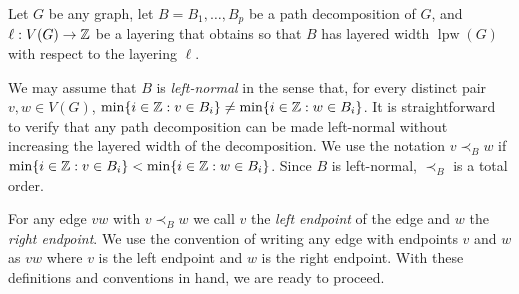 \documentclass{patmorin}
\DeclareMathOperator{\lpw}{lpw}
\begin{document}
Let $G$ be any graph, let $B=B_1,\ldots,B_p$ be a path decomposition of $G$, and $\ell:V(G)\to\mathbb{Z}$ be a layering that obtains so that $B$ has layered width $\lpw(G)$ with respect to the layering $\ell$.

We may assume that $B$ is \emph{left-normal} in the sense that, for every distinct pair $v,w\in V(G)$, $\min\{i\in\mathbb{Z} : v\in B_i\} \neq \min\{i\in\mathbb{Z}:w\in B_i\}$. It is straightforward to verify that any path decomposition can be made left-normal without increasing the layered width of the decomposition. 
We use the notation $v\prec_B w$ if $\min\{i\in\mathbb{Z} : v\in B_i\} < \min\{i\in\mathbb{Z}:w\in B_i\}$.  Since $B$ is left-normal, $\prec_B$ is a total order.

For any edge $vw$ with $v\prec_B w$ we call $v$ the \emph{left endpoint} of the edge and $w$ the \emph{right endpoint}.  We use the convention of writing any edge with endpoints $v$ and $w$ as $vw$ where $v$ is the left endpoint and $w$ is the right endpoint.  With these definitions and conventions in hand, we are ready to proceed.
\end{document}
